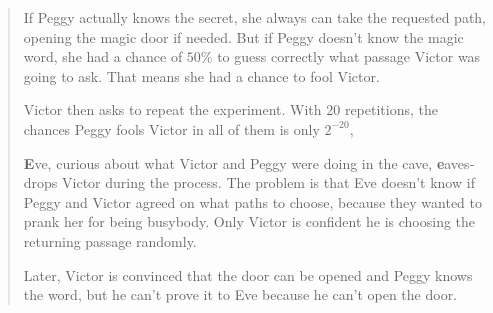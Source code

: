 \begin{otherlanguage}{english}
\begin{quote}
	If Peggy actually knows the secret, she always can take the requested path, opening the magic door if needed.
	But if Peggy doesn't know the magic word, she had a chance of $50\%$ to guess correctly what passage Victor was going to ask. That means she had a chance to fool Victor.
	
	Victor then asks to repeat the experiment. With $20$ repetitions, the chances Peggy fools Victor in all of them is only  $2^{-20}$,
	
	\textbf{E}ve, curious about what Victor and Peggy were doing in the cave, \textbf{e}avesdrops Victor during the process. The problem is that Eve doesn't know if Peggy and Victor agreed on what paths to choose, because they wanted to prank her for being busybody. Only Victor is confident he is choosing the returning passage randomly.
	
	Later, Victor is convinced that the door can be opened and Peggy knows the word, but he can't prove it to Eve because he can't open the door. 
\end{quote}




\end{otherlanguage}

\endgroup			

\vfill